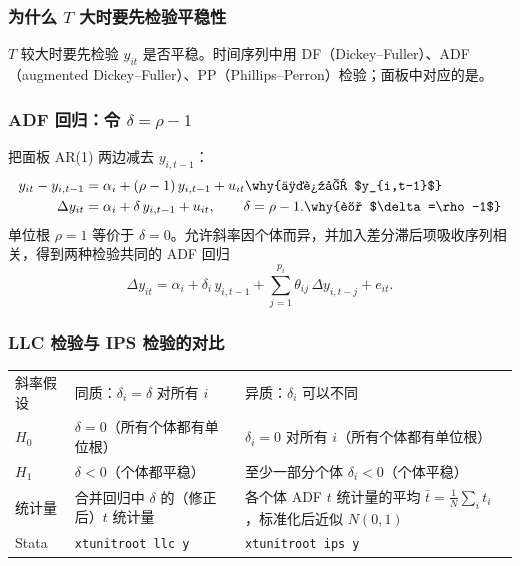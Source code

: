 \subsubsection{为什么 \texorpdfstring{$T$}{T} 大时要先检验平稳性}

$T$ 较大时要先检验 $y_{it}$ 是否平稳。时间序列中用 DF（Dickey–Fuller）、ADF（augmented Dickey–Fuller）、PP（Phillips–Perron）检验；面板中对应的是。

\subsubsection{ADF 回归：令 \texorpdfstring{$\delta=\rho-1$}{delta = rho - 1}}

把面板 AR(1) 两边减去 $y_{i,t-1}$：
\begin{align*}
y_{it}-y_{i,t-1}&=\alpha_i+(\rho-1)\,y_{i,t-1}+u_{it} \why{两边减 $y_{i,t-1}$}\\
\Delta y_{it}&=\alpha_i+\delta\,y_{i,t-1}+u_{it},\qquad\delta=\rho-1. \why{记 $\delta=\rho-1$}
\end{align*}
单位根 $\rho=1$ 等价于 $\delta=0$。允许斜率因个体而异，并加入差分滞后项吸收序列相关，得到两种检验共同的 ADF 回归
\[
\Delta y_{it}=\alpha_i+\delta_i\,y_{i,t-1}+\sum_{j=1}^{p_i}\theta_{ij}\,\Delta y_{i,t-j}+e_{it}.
\]

\subsubsection{LLC 检验与 IPS 检验的对比}

\begin{center}
\begin{minipage}{\linewidth}\centering\small
{}
\begin{tabularx}{\linewidth}{lLL}
\toprule
 &  & \\
\midrule
斜率假设 & 同质：$\delta_i=\delta$ 对所有 $i$ & 异质：$\delta_i$ 可以不同\\
$H_0$ & $\delta=0$（所有个体都有单位根） & $\delta_i=0$ 对所有 $i$（所有个体都有单位根）\\
$H_1$ & $\delta<0$（个体都平稳） & 至少一部分个体 $\delta_i<0$（个体平稳）\\
统计量 & 合并回归中 $\delta$ 的（修正后）$t$ 统计量 & 各个体 ADF $t$ 统计量的平均 $\bar t=\frac1N\sum_i t_i$，标准化后近似 $N(0,1)$\\
Stata & \texttt{xtunitroot llc y} & \texttt{xtunitroot ips y}\\
\bottomrule
\end{tabularx}
\end{minipage}
\end{center}

